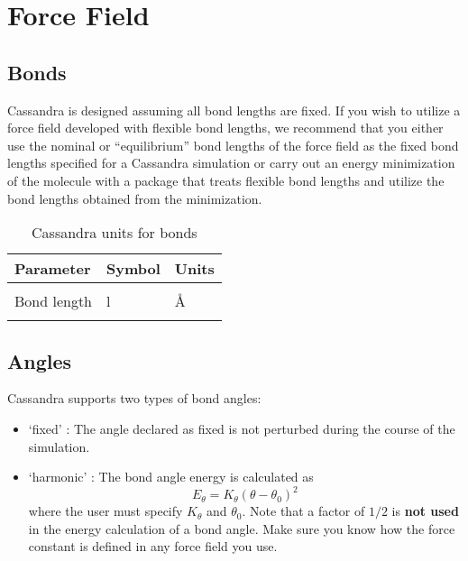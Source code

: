 \chapter{Force Field} \label{Chapter:Force Field}


\section{Bonds} \label{Sec:Bonds}
Cassandra is designed assuming all bond lengths are fixed. If you wish
to utilize a force field developed with flexible bond lengths, we
recommend that you either use the nominal or ``equilibrium'' bond
lengths of the force field as the fixed bond lengths specified for a
Cassandra simulation or carry out an energy minimization of the
molecule with a package that treats flexible bond lengths and utilize
the bond lengths obtained from the minimization. 

\begin{center}
\begin{table}[h]
	\begin{center}
	\caption{Cassandra units for bonds}
	\begin{tabular} {l l l} \\ \hline \hline
	Parameter  & Symbol  & Units \\ \hline \\
	Bond length  & l  & \AA \\ \hline \\
	\end{tabular}
	\end{center}
	\label{Tab:Bond_Units}
\end{table}
\end{center}

\section{Angles}\label{Sec:Angles}

Cassandra supports two types of bond angles:
\begin{itemize}
\item `fixed' : The angle declared as fixed is not perturbed during the course of the simulation.
\item `harmonic' : The bond angle energy is calculated as 
\begin{equation}
E_\theta = K_\theta (\theta - \theta_0)^2
\label{Eq:angle_potential}
\end{equation}
where the user must specify $K_\theta$ and $\theta_0$. Note that a factor
of $1/2$ is {\bf not used} in the energy calculation of a bond
angle. Make sure you know how the force constant is defined in any
force field you use. 
\end{itemize}

